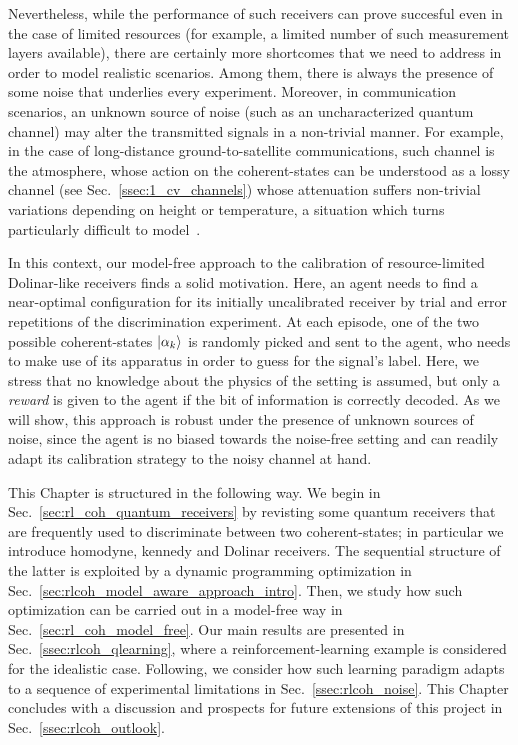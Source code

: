 Nevertheless, while the performance of such receivers can prove succesful even in the case of limited resources (for example, a limited number of such measurement layers available), there are certainly more shortcomes that we need to address in order to model realistic scenarios. Among them, there is always the presence of some noise that underlies every experiment. Moreover, in communication scenarios, an unknown source of noise (such as an uncharacterized quantum channel) may alter the transmitted signals in a non-trivial manner. For example, in the case of long-distance ground-to-satellite communications, such channel is the atmosphere, whose action on the coherent-states can be understood as a lossy channel (see Sec.~\ref{ssec:1_cv_channels}) whose attenuation suffers non-trivial variations depending on height or temperature, a situation which turns particularly difficult to model~\cite{Dequal2020,Andrews2005,Usenko2012a,Pirandola2021,Pirandola2021a,Vasylyev2011,Vasylyev2017}.

In this context, our model-free approach to the calibration of resource-limited Dolinar-like receivers finds a solid motivation. Here, an agent needs to find a near-optimal configuration for its initially uncalibrated receiver by trial and error repetitions of the discrimination experiment. At each episode, one of the two possible coherent-states $\ket{\alpha_k}$ is randomly picked and sent to the agent, who needs to make use of its apparatus in order to guess for the signal's label. Here, we stress that no knowledge about the physics of the setting is assumed, but only a \textit{reward} is given to the agent if the bit of information is correctly decoded. As we will show, this approach is robust under the presence of unknown sources of noise, since the agent is no biased towards the noise-free setting and can readily adapt its calibration strategy to the noisy channel at hand.

This Chapter is structured in the following way. We begin in Sec.~\ref{sec:rl_coh_quantum_receivers} by revisting some quantum receivers that are frequently used to discriminate between two coherent-states; in particular we introduce homodyne, kennedy and Dolinar receivers. The sequential structure of the latter is exploited by a dynamic programming optimization in Sec.~\ref{sec:rlcoh_model_aware_approach_intro}. Then, we study how such optimization can be carried out in a model-free way in Sec.~\ref{sec:rl_coh_model_free}.
Our main results are presented in Sec.~\ref{ssec:rlcoh_qlearning}, where a reinforcement-learning example is considered for the idealistic case. Following, we consider how such learning paradigm adapts to a sequence of experimental limitations in Sec.~\ref{ssec:rlcoh_noise}. This Chapter concludes with a discussion and prospects for future extensions of this project in Sec.~\ref{ssec:rlcoh_outlook}.
